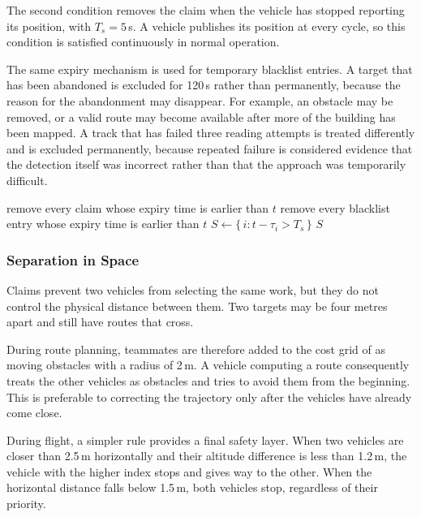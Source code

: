 The second condition removes the claim when the vehicle has stopped reporting its
position, with $T_s = 5$\,s. A vehicle publishes its position at every cycle, so
this condition is satisfied continuously in normal operation.

The same expiry mechanism is used for temporary blacklist entries. A target that
has been abandoned is excluded for 120\,s rather than permanently, because the
reason for the abandonment may disappear. For example, an obstacle may be
removed, or a valid route may become available after more of the building has
been mapped. A track that has failed three reading attempts is treated
differently and is excluded permanently, because repeated failure is considered
evidence that the detection itself was incorrect rather than that the approach
was temporarily difficult.

\begin{algorithm}[!htb]
    \caption{AgeSharedState}%
    \label{algo:sys:age}
    remove every claim whose expiry time is earlier than $t$\;
    remove every blacklist entry whose expiry time is earlier than $t$\;
    $S \gets \{\, i : t - \tau_i > T_s \,\}$ 
    \KwRet$S$\;
\end{algorithm}

\FloatBarrier

\subsubsection*{Separation in Space}

Claims prevent two vehicles from selecting the same work, but they do not control
the physical distance between them. Two targets may be four metres apart and
still have routes that cross.

During route planning, teammates are therefore added to the cost grid of
 as moving obstacles with a radius of 2\,m. A vehicle
computing a route consequently treats the other vehicles as obstacles and tries
to avoid them from the beginning. This is preferable to correcting the trajectory
only after the vehicles have already come close.

During flight, a simpler rule provides a final safety layer. When two vehicles
are closer than 2.5\,m horizontally and their altitude difference is less than
1.2\,m, the vehicle with the higher index stops and gives way to the other. When
the horizontal distance falls below 1.5\,m, both vehicles stop, regardless of
their priority.

